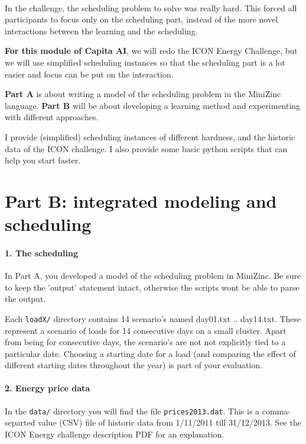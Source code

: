 \documentclass[a4,12pt]{article}
\begin{document}
\paragraph{}
In the challenge, the scheduling problem to solve was really hard. This forced all participants to focus only on the scheduling part, instead of the more novel interactions between the learning and the scheduling.

\textbf{For this module of Capita AI}, we will redo the ICON Energy Challenge, but we will use simplified scheduling instances so that the scheduling part is a lot easier and focus can be put on the interaction.

\textbf{Part A} is about writing a model of the scheduling problem in the MiniZinc language. \textbf{Part B} will be about developing a learning method and experimenting with different approaches.

I provide (simplified) scheduling instances of different hardness, and the historic data of the ICON challenge. I also provide some basic python scripts that can help you start faster.


\section{Part B: integrated modeling and scheduling}
\paragraph{1. The scheduling}
In Part A, you developed a model of the scheduling problem in MiniZinc. Be sure to keep the 'output' statement intact, otherwise the scripts wont be able to parse the output.

Each \texttt{loadX/} directory contains 14 scenario's named day01.txt .. day14.txt. These represent a scenario of loads for 14 consecutive days on a small cluster. Apart from being for consecutive days, the scenario's are not not explicitly tied to a particular date. Choosing a starting date for a load (and comparing the effect of different starting dates throughout the year) is part of your evaluation. 

\paragraph{2. Energy price data}
In the \texttt{data/} directory you will find the file \texttt{prices2013.dat}. This is a comma-separted value (CSV) file of historic data from 1/11/2011 till 31/12/2013. See the ICON Energy challenge description PDF for an explanation.
\end{document}
